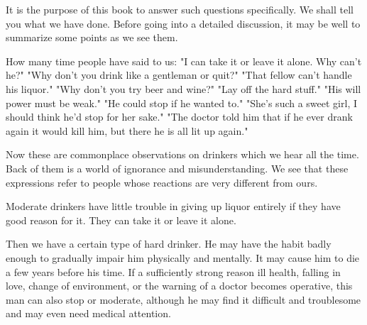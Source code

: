 \begin{biblechapter}

It is the purpose of this book to answer such questions specifically. 
We shall tell you what we have done. 
Before going into a detailed discussion, it may be well to summarize some points as we see them.

How many time people have said to us: 
"I can take it or leave it alone. Why can't he?" 
"Why don't you drink like a gentleman or quit?" 
"That fellow can't handle his liquor." 
"Why don't you try beer and wine?" 
"Lay off the hard stuff." 
"His will power must be weak." 
"He could stop if he wanted to." 
"She's such a sweet girl, I should think he'd stop for her sake." 
"The doctor told him that if he ever drank again it would kill him, but there he is all lit up again."

Now these are commonplace observations on drinkers which we hear all the time. 
Back of them is a world of ignorance and misunderstanding. 
We see that these expressions refer to people whose reactions are very different from ours.

Moderate drinkers have little trouble in giving up liquor entirely if they have good reason for it. 
They can take it or leave it alone.

Then we have a certain type of hard drinker. 
He may have the habit badly enough to gradually impair him physically and mentally. 
It may cause him to die a few years before his time. 
If a sufficiently strong reason ill health, falling in love, change of environment, or the warning of a doctor becomes operative, 
this man can also stop or moderate, 
although he may find it difficult and troublesome and may even need medical attention.
\end{biblechapter}


